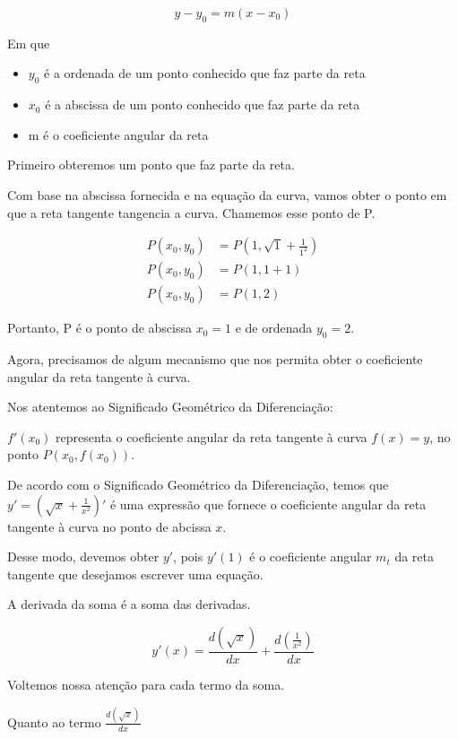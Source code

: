 \documentclass{article}
\begin{document}
\[
    y - y_0 = m (x - x_0)
\]

Em que
\begin{itemize}
    \item \(y_0\) é a ordenada de um ponto conhecido que faz parte da reta
    \item \(x_0\) é a abscissa de um ponto conhecido que faz parte da reta
    \item m é o coeficiente angular da reta
\end{itemize}

Primeiro obteremos um ponto que faz parte da reta.

Com base na abscissa fornecida e na equação da curva,
vamos obter o ponto em que a reta tangente tangencia a curva.
Chamemos esse ponto de P.


\begin{align*}
    P(x_0, y_0) & = P\left(1, \sqrt{1} + \frac{1}{1^2}\right)
    \\
    P(x_0, y_0) & = P\left(1, 1 + 1\right)
    \\
    P(x_0, y_0) & = P(1, 2)
\end{align*}

Portanto, P é o ponto de abscissa \(x_0=1\) e de ordenada \(y_0=2\).

Agora, precisamos de algum mecanismo que nos permita obter
o coeficiente angular da reta tangente à curva.

Nos atentemos ao Significado Geométrico da Diferenciação:

\(f'(x_0)\) representa o coeficiente angular da reta tangente
à curva \(f(x) = y\), no ponto \(P(x_0, f(x_0))\).

De acordo com o Significado Geométrico da Diferenciação,
temos que \(y' = (\sqrt{x} + \frac{1}{x^2})'\) é uma expressão
que fornece o coeficiente angular da reta tangente à curva no
ponto de abcissa \(x\).

Desse modo, devemos obter \(y'\), pois \(y'(1)\) é o coeficiente
angular \(m_t\) da reta tangente que desejamos escrever uma equação.

A derivada da soma é a soma das derivadas.

\begin{equation}\label{eq:q6_soma}
    y'(x) = \frac{d(\sqrt{x})}{dx} + \frac{d(\frac{1}{x^2})}{dx}
\end{equation}

Voltemos nossa atenção para cada termo da soma.

Quanto ao termo \( \frac{d(\sqrt{x})}{dx}\)
\end{document}
